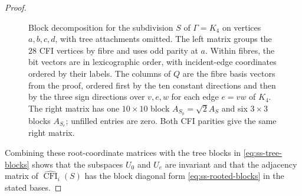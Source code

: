 \documentclass[10pt,a4paper]{article}
\theoremstyle{plain}
\theoremstyle{definition}
\DeclareMathOperator{\CFI}{CFI}
\begin{document}
\begin{proof}
\begin{figure}[tb]
\caption{Block decomposition for the subdivision $S$ of $\Gamma=K_4$
on vertices $a,b,c,d$, with tree attachments omitted.
The left matrix groups the $28$ CFI vertices by fibre and uses odd parity
at $a$. Within fibres, the bit vectors are in lexicographic order,
with incident-edge coordinates ordered by their labels.
The columns of $Q$ are the fibre basis vectors from the proof, ordered
first by the ten constant directions and then by the three sign directions
over $v,e,w$ for each edge $e=vw$ of $K_4$.
The right matrix has one $10\times10$ block $A_{S_0}=\sqrt2 A_S$ and
six $3\times3$ blocks $A_{S_e}$; unfilled entries are zero.
Both CFI parities give the same right matrix.}
\label{fig:ss-cfi-blocks}
\end{figure}

Combining these root-coordinate matrices with the tree blocks in
\cref{eq:ss-tree-blocks} shows that the subspaces $U_0$ and $U_e$
are invariant and that the adjacency matrix of $\widehat{\CFI}_i(S)$ has the block diagonal form
\cref{eq:ss-rooted-blocks} in the stated bases.
\end{proof}
\end{document}

